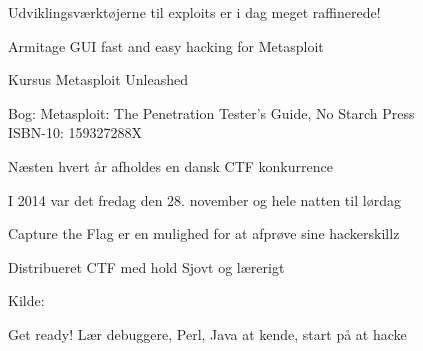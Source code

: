 \documentclass[20pt,landscape,a4paper,footrule]{foils}
\begin{document}


\centerline{}




\begin{list1}
\item Udviklingsværktøjerne til exploits er i dag meget raffinerede!
\item {}
\item Armitage GUI fast and easy hacking for Metasploit\\
\item Kursus Metasploit Unleashed\\
\item Bog: Metasploit: The Penetration Tester's Guide, No Starch Press\\
ISBN-10: 159327288X
\end{list1}





\begin{list1}
\item Næsten hvert år afholdes en dansk CTF konkurrence
\item I 2014 var det fredag den 28. november og hele natten til lørdag
\item Capture the Flag er en mulighed for at afprøve sine hackerskillz
\item Distribueret CTF med hold  Sjovt og lærerigt
\end{list1}
Kilde: 

\centerline{Get ready! Lær debuggere, Perl, Java at kende, start på at hacke}


\end{document}
